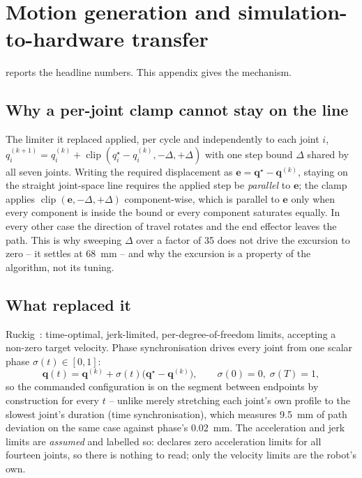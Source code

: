 \chapter{Motion generation and simulation-to-hardware transfer}
\label{ch:motion}

 reports the headline numbers. This appendix gives the
mechanism.

\section{Why a per-joint clamp cannot stay on the line}
\label{sec:clamp-maths}

The limiter it replaced applied, per cycle and independently to each joint
$i$, $q_i^{(k+1)} = q_i^{(k)} + \operatorname{clip}(q_i^\star - q_i^{(k)},
-\Delta, +\Delta)$ with one step bound $\Delta$ shared by all seven joints.
Writing the required displacement as $\mathbf{e}=\mathbf{q}^\star-\mathbf{q}^{(k)}$,
staying on the straight joint-space line requires the applied step be
\emph{parallel} to $\mathbf{e}$; the clamp applies
$\operatorname{clip}(\mathbf{e},-\Delta,+\Delta)$ component-wise, which is
parallel to $\mathbf{e}$ only when every component is inside the bound or
every component saturates equally. In every other case the direction of
travel rotates and the end effector leaves the path. This is why sweeping
$\Delta$ over a factor of 35 does not drive the excursion to zero -- it
settles at \SI{68}{\milli\metre} -- and why the excursion is a property of
the algorithm, not its tuning.

\section{What replaced it}

Ruckig~\cite{berscheid2021ruckig}: time-optimal, jerk-limited, per-degree-of-freedom
limits, accepting a non-zero target velocity. Phase synchronisation drives
every joint from one scalar phase $\sigma(t)\in[0,1]$:
\begin{equation}
  \mathbf{q}(t) = \mathbf{q}^{(k)} + \sigma(t)\bigl(\mathbf{q}^\star-\mathbf{q}^{(k)}\bigr),
  \qquad \sigma(0)=0,\; \sigma(T)=1,
  \label{eq:phase-sync}
\end{equation}
so the commanded configuration is on the segment between endpoints by
construction for every $t$ -- unlike merely stretching each joint's own
profile to the slowest joint's duration (time synchronisation), which
measures \SI{9.5}{\milli\metre} of path deviation on the same case against
phase's \SI{0.02}{\milli\metre}. The acceleration and jerk limits are
\emph{assumed} and labelled so:  declares zero
acceleration limits for all fourteen joints, so there is nothing to read;
only the velocity limits are the robot's own.

